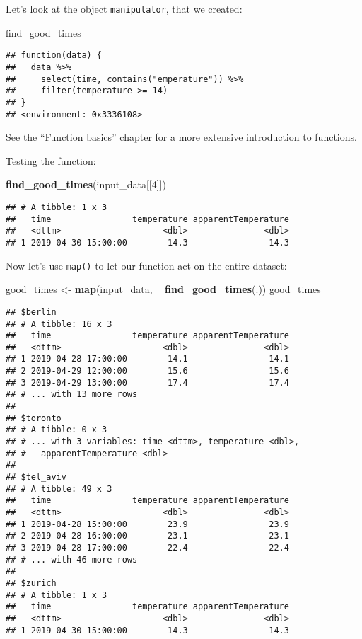 \documentclass[]{book}
\newenvironment{Shaded}{\begin{snugshade}}{\end{snugshade}}
\newcommand{\DecValTok}[1]{\textcolor[rgb]{0.00,0.00,0.81}{#1}}
\newcommand{\KeywordTok}[1]{\textcolor[rgb]{0.13,0.29,0.53}{\textbf{#1}}}
\newcommand{\NormalTok}[1]{#1}
\newcommand{\OperatorTok}[1]{\textcolor[rgb]{0.81,0.36,0.00}{\textbf{#1}}}
\newcommand{\StringTok}[1]{\textcolor[rgb]{0.31,0.60,0.02}{#1}}
\begin{document}
Let's look at the object \texttt{manipulator}, that we created:

\begin{Shaded}
\begin{Highlighting}[]
\NormalTok{find_good_times}
\end{Highlighting}
\end{Shaded}

\begin{verbatim}
## function(data) {
##   data %>%
##     select(time, contains("emperature")) %>%
##     filter(temperature >= 14)
## }
## <environment: 0x3336108>
\end{verbatim}

See the \protect\hyperlink{function-basics}{``Function basics''} chapter for a more extensive introduction to functions.

Testing the function:

\begin{Shaded}
\begin{Highlighting}[]
\KeywordTok{find_good_times}\NormalTok{(input_data[[}\DecValTok{4}\NormalTok{]])}
\end{Highlighting}
\end{Shaded}

\begin{verbatim}
## # A tibble: 1 x 3
##   time                temperature apparentTemperature
##   <dttm>                    <dbl>               <dbl>
## 1 2019-04-30 15:00:00        14.3                14.3
\end{verbatim}

Now let's use \texttt{map()} to let our function act on the entire dataset:

\begin{Shaded}
\begin{Highlighting}[]
\NormalTok{good_times <-}\StringTok{ }\KeywordTok{map}\NormalTok{(input_data, }\OperatorTok{~}\StringTok{ }\KeywordTok{find_good_times}\NormalTok{(.))}
\NormalTok{good_times}
\end{Highlighting}
\end{Shaded}

\begin{verbatim}
## $berlin
## # A tibble: 16 x 3
##   time                temperature apparentTemperature
##   <dttm>                    <dbl>               <dbl>
## 1 2019-04-28 17:00:00        14.1                14.1
## 2 2019-04-29 12:00:00        15.6                15.6
## 3 2019-04-29 13:00:00        17.4                17.4
## # ... with 13 more rows
## 
## $toronto
## # A tibble: 0 x 3
## # ... with 3 variables: time <dttm>, temperature <dbl>,
## #   apparentTemperature <dbl>
## 
## $tel_aviv
## # A tibble: 49 x 3
##   time                temperature apparentTemperature
##   <dttm>                    <dbl>               <dbl>
## 1 2019-04-28 15:00:00        23.9                23.9
## 2 2019-04-28 16:00:00        23.1                23.1
## 3 2019-04-28 17:00:00        22.4                22.4
## # ... with 46 more rows
## 
## $zurich
## # A tibble: 1 x 3
##   time                temperature apparentTemperature
##   <dttm>                    <dbl>               <dbl>
## 1 2019-04-30 15:00:00        14.3                14.3
\end{verbatim}
\end{document}
